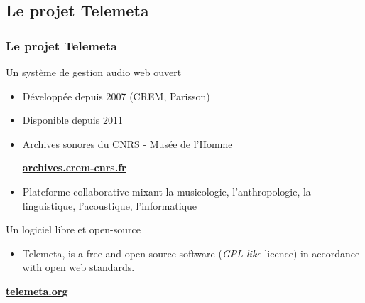 \documentclass[final, hyperref, table]{beamer}
\begin{document}
\subsection{Le projet Telemeta}
\begin{frame}\frametitle{Le projet Telemeta}
  \begin{block}{Un système de gestion audio web ouvert}
      \begin{itemize}
      \item Développée depuis 2007 (CREM, Parisson)
      \item Disponible depuis 2011
       \vspace{-0.1cm}
       \item Archives sonores du CNRS - Musée de l'Homme
       \begin{center}
        \bf\href{http://archives.crem-cnrs.fr}{archives.crem-cnrs.fr}
       \end{center}
    \item Plateforme collaborative mixant la musicologie, l'anthropologie, la linguistique, l'acoustique, l'informatique
    \end{itemize}   
     
\end{block}

    \begin{block}{Un logiciel libre et open-source}
    \begin{itemize}
    \item Telemeta, is a \alert{free and open source software} (\emph{GPL-like} licence)
       in accordance with \alert{open web standards}.
    \end{itemize}
    \vspace{-0.5cm}
    \begin{center}
\hspace{1cm}
      \textbf{\href{http://telemeta.org}{telemeta.org}}
    \end{center}
  \end{block}
\end{frame}
\end{document}
